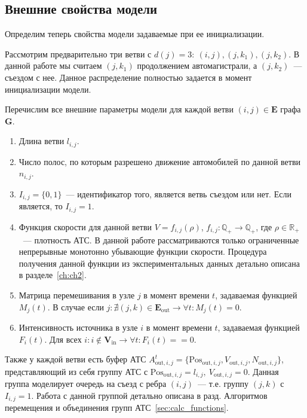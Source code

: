 \subsection{Внешние свойства модели}
\label{sec:graph_structure}
Определим теперь свойства модели задаваемые при ее инициализации.

Рассмотрим предварительно три ветви с \(d(j) = 3:\ (i, j), (j, k_1), (j, k_2)\). 
В данной работе мы считаем \((j, k_1)\) продолжением автомагистрали, а \((j, k_2)\)~--- съездом с нее. Данное распределение полностью задается в момент инициализации модели.

Перечислим все внешние параметры модели для каждой ветви \((i, j) \in \mathbf{E}\) графа \(\mathbf{G}\).
\begin{enumerate}
    \item Длина ветви \(l_{i, j}\).
    \item Число полос, по которым разрешено движение автомобилей по данной ветви \(n_{i, j}\).
    \item \(I_{i, j} = \{0, 1\}\)~--- идентификатор того, является ветвь съездом или нет. Если является, то \(I_{i, j} = 1\).
    \item Функция скорости для данной ветви \(V = f_{i,j}(\rho)\), \(f_{i,j}: \mathbb{Q}_+ \rightarrow \mathbb{Q}_+\), где \(\rho\in\mathbb{R}_+\)~--- плотность АТС.
        В данной работе рассматриваются только ограниченные непрерывные монотонно убывающие функции скорости.
        Процедура получения данной функции из экспериментальных данных детально описана в разделе~\ref{ch:ch2}.
    \item Матрица перемешивания в узле \(j\) в момент времени \(t\), задаваемая функцией \(M_j(t)\).
        В случае если \(j: \nexists (j,k) \in \mathbf{E}_\text{out} \rightarrow \forall t: M_j(t) = 0\).
    \item Интенсивность источника в узле \(i\) в момент времени \(t\), задаваемая функцией \(F_i(t)\). Для всех \(i: i\notin \mathbf{V}_\text{in} \rightarrow \forall t: F_i(t) == 0\).
\end{enumerate}

Также у каждой ветви есть буфер АТС \(A^t_{\text{out}, i, j} = \{\mathrm{Pos}_{\text{out}, i, j}, V_{\text{out}, i, j}, N_{\text{out}, i, j}\}\), представляющий из себя группу АТС с \(\mathrm{Pos}_{\text{out}, i, j} = l_{i, j},\ V_{\text{out}, i, j} = 0\). 
Данная группа моделирует очередь на съезд с ребра \((i, j)\)~--- т.е. группу \((j, k)\) с \(I_{i, j} = 1\). 
Работа с данной группой детально описана в разд. 
Алгоритмов перемещения и объединения групп АТС~\ref{sec:calc_functions}.


